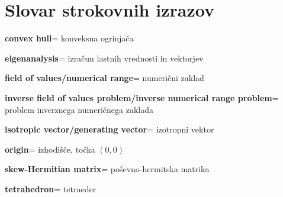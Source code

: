 \documentclass[12pt,a4paper]{amsart}
\theoremstyle{definition}
\theoremstyle{plain}
\newcommand{\geslo}[2]{\noindent\textbf{#1}\hspace*{3mm}\hangindent=\parindent\hangafter=1 #2}
\begin{document}
\newpage




\vfill

\section*{Slovar strokovnih izrazov}

\geslo{convex hull}{konveksna ogrinjača}

\geslo{eigenanalysis}{izračun lastnih vrednosti in vektorjev}

\geslo{field of values/numerical range}{numerični zaklad}

\geslo{inverse field of values problem/inverse numerical range problem}{problem inverznega numeričnega zaklada}

\geslo{isotropic vector/generating vector}{izotropni vektor}

\geslo{origin}{izhodišče, točka $(0,0)$}

\geslo{skew-Hermitian matrix}{poševno-hermitska matrika}

\geslo{tetrahedron}{tetraeder}




\end{document}
